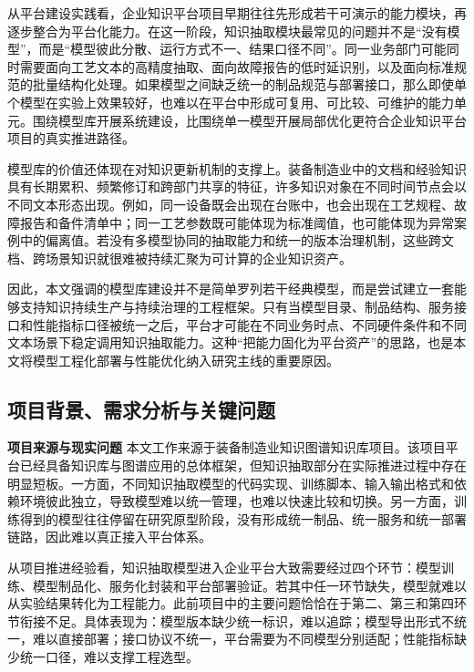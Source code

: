 从平台建设实践看，企业知识平台项目早期往往先形成若干可演示的能力模块，再逐步整合为平台化能力。在这一阶段，知识抽取模块最常见的问题并不是“没有模型”，而是“模型彼此分散、运行方式不一、结果口径不同”。同一业务部门可能同时需要面向工艺文本的高精度抽取、面向故障报告的低时延识别，以及面向标准规范的批量结构化处理。如果模型之间缺乏统一的制品规范与部署接口，那么即使单个模型在实验上效果较好，也难以在平台中形成可复用、可比较、可维护的能力单元。围绕模型库开展系统建设，比围绕单一模型开展局部优化更符合企业知识平台项目的真实推进路径。

模型库的价值还体现在对知识更新机制的支撑上。装备制造业中的文档和经验知识具有长期累积、频繁修订和跨部门共享的特征，许多知识对象在不同时间节点会以不同文本形态出现。例如，同一设备既会出现在台账中，也会出现在工艺规程、故障报告和备件清单中；同一工艺参数既可能体现为标准阈值，也可能体现为异常案例中的偏离值。若没有多模型协同的抽取能力和统一的版本治理机制，这些跨文档、跨场景知识就很难被持续汇聚为可计算的企业知识资产。

因此，本文强调的模型库建设并不是简单罗列若干经典模型，而是尝试建立一套能够支持知识持续生产与持续治理的工程框架。只有当模型目录、制品结构、服务接口和性能指标口径被统一之后，平台才可能在不同业务时点、不同硬件条件和不同文本场景下稳定调用知识抽取能力。这种“把能力固化为平台资产”的思路，也是本文将模型工程化部署与性能优化纳入研究主线的重要原因。

\subsection{项目背景、需求分析与关键问题}
\par\textbf{项目来源与现实问题}
本文工作来源于装备制造业知识图谱知识库项目。该项目平台已经具备知识库与图谱应用的总体框架，但知识抽取部分在实际推进过程中存在明显短板。一方面，不同知识抽取模型的代码实现、训练脚本、输入输出格式和依赖环境彼此独立，导致模型难以统一管理，也难以快速比较和切换。另一方面，训练得到的模型往往停留在研究原型阶段，没有形成统一制品、统一服务和统一部署链路，因此难以真正接入平台体系。

从项目推进经验看，知识抽取模型进入企业平台大致需要经过四个环节：模型训练、模型制品化、服务化封装和平台部署验证。若其中任一环节缺失，模型就难以从实验结果转化为工程能力。此前项目中的主要问题恰恰在于第二、第三和第四环节衔接不足。具体表现为：模型版本缺少统一标识，难以追踪；模型导出形式不统一，难以直接部署；接口协议不统一，平台需要为不同模型分别适配；性能指标缺少统一口径，难以支撑工程选型。

